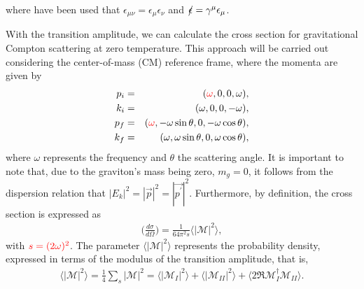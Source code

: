\documentclass[11pt,showpacs,preprintnumbers,amsmath,amssymb,prd,nofootinbib,superscriptaddress]{revtex4-2}
\begin{document}
where have been used that $\epsilon_{\mu\nu}=\epsilon_\mu \epsilon_\nu$ and $\slashed{\epsilon}=\gamma^\mu \epsilon_\mu$. 

With the transition amplitude, we can calculate the cross section for gravitational Compton scattering at zero temperature. This approach will be carried out considering the center-of-mass (CM) reference frame, where the momenta are given by
\begin{eqnarray}
    p_i&=&({\color{red}\omega},0,0,\omega),\nonumber\\
    k_i&=&(\omega,0,0,-\omega),\nonumber\\
    p_f&=&({\color{red}\omega},-\omega\sin{\theta},0,-\omega\cos{\theta}),\nonumber\\
    k_f&=&(\omega,\omega\sin{\theta,0,\omega\cos{\theta}}),
\end{eqnarray}
where $\omega$ represents the frequency and $\theta$ the scattering angle. It is important to note that, due to the graviton's mass being zero, $m_g=0$, it follows from the dispersion relation that $|E_k|^2=|\vec{p}|^2=|\vec{p^\prime}|^2$. Furthermore, by definition, the cross section is expressed as
\begin{eqnarray}
    \Big(\frac{d\sigma}{d\Omega}\Big)=\frac{1}{64\pi^2 s}\langle|\mathcal{M}|^2\rangle,\label{3.2}
\end{eqnarray}
with ${\color{red}s=(2\omega)^2}$. The parameter $\langle|\mathcal{M}|^2\rangle$  represents the probability density, expressed in terms of the modulus of the transition amplitude, that is,
\begin{eqnarray}
    \langle|\mathcal{M}|^2\rangle=\frac{1}{4}\sum_s|\mathcal{M}|^2=\langle|\mathcal{M}_I|^2\rangle+\langle|\mathcal{M}_{II}|^2\rangle+\langle2\Re\mathcal{M}_I^\dagger\mathcal{M}_{II}\rangle.\label{3.3}
\end{eqnarray}
\end{document}
